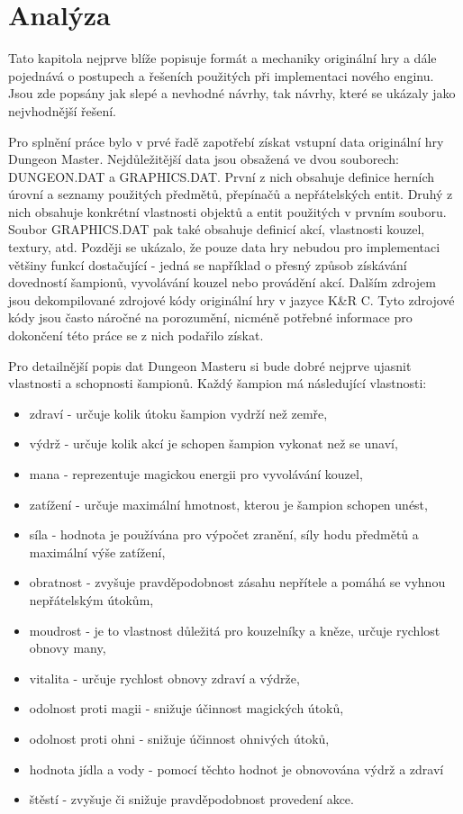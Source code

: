 \chapter{Analýza}

Tato kapitola nejprve blíže popisuje formát a mechaniky originální hry a dále pojednává o postupech a řešeních použitých 
při implementaci nového enginu. Jsou zde popsány jak slepé a nevhodné návrhy, tak návrhy, které se ukázaly 
jako nejvhodnější řešení.

Pro splnění práce bylo v prvé řadě zapotřebí získat vstupní data originální hry Dungeon Master. Nejdůležitější data 
jsou obsažená ve dvou souborech: DUNGEON.DAT a GRAPHICS.DAT. První z nich obsahuje definice herních úrovní a seznamy 
použitých předmětů, přepínačů a nepřátelských entit. Druhý z nich obsahuje konkrétní vlastnosti objektů a entit použitých v prvním souboru. 
Soubor GRAPHICS.DAT pak také obsahuje definicí akcí, vlastnosti kouzel, textury, atd. Později se ukázalo, že pouze data hry nebudou
pro implementaci většiny funkcí dostačující - jedná se například o přesný způsob získávání dovedností šampionů, 
vyvolávání kouzel nebo provádění akcí. Dalším zdrojem jsou dekompilované zdrojové kódy\cite{DMDecompilation} originální hry v jazyce K\&R C.
Tyto zdrojové kódy jsou často náročné na porozumění, nicméně potřebné informace pro dokončení této práce se z nich podařilo získat.

Pro detailnější popis dat Dungeon Masteru si bude dobré nejprve ujasnit vlastnosti a schopnosti šampionů.
Každý šampion má následující vlastnosti:
\begin{itemize}
\item zdraví - určuje kolik útoku šampion vydrží než zemře,
\item výdrž - určuje kolik akcí je schopen šampion vykonat než se unaví, 
\item mana - reprezentuje magickou energii pro vyvolávání kouzel, 
\item zatížení - určuje maximální hmotnost, kterou je šampion schopen unést,
\item síla - hodnota je používána pro výpočet zranění, síly hodu předmětů a maximální výše zatížení,
\item obratnost - zvyšuje pravděpodobnost zásahu nepřítele a pomáhá se vyhnou nepřátelským útokům,
\item moudrost - je to vlastnost důležitá pro kouzelníky a kněze, určuje rychlost obnovy many,
\item vitalita - určuje rychlost obnovy zdraví a výdrže,
\item odolnost proti magii - snižuje účinnost magických útoků,
\item odolnost proti ohni - snižuje účinnost ohnivých útoků,
\item hodnota jídla a vody - pomocí těchto hodnot je obnovována výdrž a zdraví
\item štěstí - zvyšuje či snižuje pravděpodobnost provedení akce.
\end{itemize}

